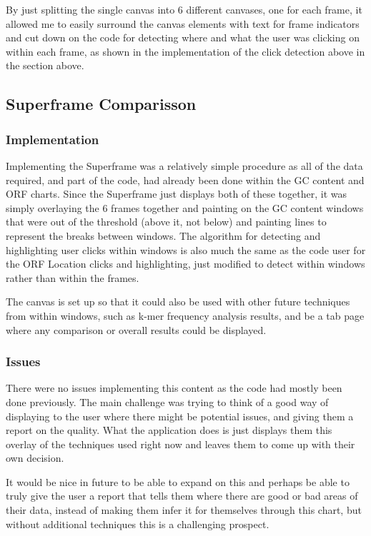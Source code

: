 By just splitting the single canvas into 6 different canvases, one for each frame, it allowed me to easily surround the canvas elements with text for frame indicators and cut down on the code for detecting where and what the user was clicking on within each frame, as shown in the implementation of the click detection above in the section above.

\subsection{Superframe Comparisson}
\subsubsection{Implementation}
Implementing the Superframe was a relatively simple procedure as all of the data required, and part of the code, had already been done within the GC content and ORF charts. Since the Superframe just displays both of these together, it was simply overlaying the 6 frames together and painting on the GC content windows that were out of the threshold (above it, not below) and painting lines to represent the breaks between windows. The algorithm for detecting and highlighting user clicks within windows is also much the same as the code user for the ORF Location clicks and highlighting, just modified to detect within windows rather than within the frames.

The canvas is set up so that it could also be used with other future techniques from within windows, such as k-mer frequency analysis results, and be a tab page where any comparison or overall results could be displayed.
\subsubsection{Issues}
There were no issues implementing this content as the code had mostly been done previously. The main challenge was trying to think of a good way of displaying to the user where there might be potential issues, and giving them a report on the quality. What the application does is just displays them this overlay of the techniques used right now and leaves them to come up with their own decision.

It would be nice in future to be able to expand on this and perhaps be able to truly give the user a report that tells them where there are good or bad areas of their data, instead of making them infer it for themselves through this chart, but without additional techniques this is a challenging prospect.

